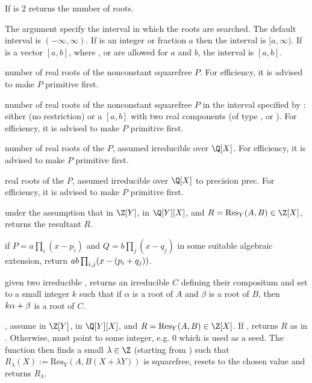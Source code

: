 \item If  is 2 returns the number of roots.

The argument  specify the interval in which the roots
are searched. The default interval is $(-\infty,\infty)$. If  is an
integer or fraction $a$ then the interval is $[a,\infty)$. If  is
a vector $[a,b]$, where ,  or  are allowed
for $a$ and $b$, the interval is $[a,b]$.

 number of real roots of the nonconstant
squarefree  $P$. For efficiency, it is advised to make $P$ primitive
first.

 number of real roots of the
nonconstant squarefree  $P$ in the interval specified by :
either  (no restriction) or a  $[a,b]$ with two real
components (of type ,  or ). For efficiency,
it is advised to make $P$ primitive first.

 number of real roots of the  $P$,
assumed irreducible over $\Q[X]$. For efficiency, it is advised to make $P$
primitive first.

 real roots of the 
$P$, assumed irreducible over $\Q[X]$ to precision prec. For efficiency, it
is advised to make $P$ primitive first.


under the assumption that  in $\Z[Y]$,  in $\Q[Y][X]$, and
$R = \text{Res}_Y(A, B) \in \Z[X]$, returns the resultant $R$.

 if
$P=a\prod_i(x-p_i)$ and $Q=b\prod_j(x-q_j)$ in some suitable algebraic
extension, return $a\*b\prod_{i,j}(x-(p_i+q_j))$.

given two irreducible , returns an irreducible  $C$ defining
their compositum and set  to a small integer $k$ such that if
$\alpha$ is a root of $A$ and $\beta$ is a root of $B$, then $k\*\alpha +
\beta$ is a root of $C$.

,
assume  in $\Z[Y]$,  in $\Q[Y][X]$, and $R =
\text{Res}_Y(A, B) \in \Z[X]$. If , returns $R$
as in . Otherwise,  must point to
some integer, e.g. $0$ which is used as a seed. The function then finds a
small $\lambda \in \Z$ (starting from ) such that
$R_\lambda(X) := \text{Res}_Y(A, B(X + \lambda Y))$ is squarefree, resets
 to the chosen value and returns $R_{\lambda}$.

